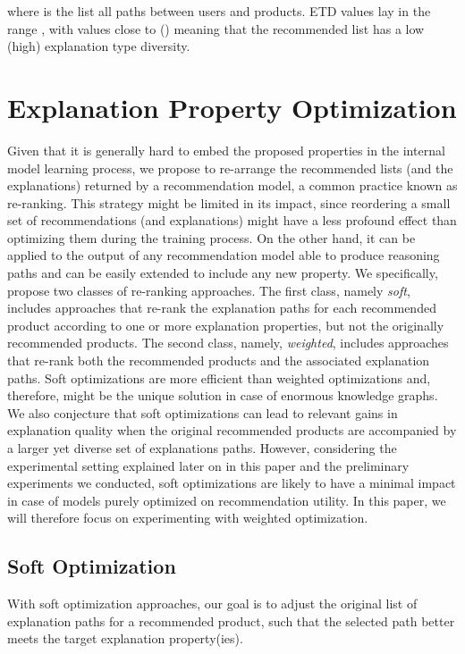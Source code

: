 \documentclass[sigconf]{acmart}
\begin{document}
\vspace{-2mm}


where  is the list all paths between users and products.
ETD values lay in the range , with values close to  () meaning that the recommended list has a low (high) explanation type diversity. 

\section{Explanation Property Optimization}\label{sec:algorithm}
Given that it is generally hard to embed the proposed properties in the internal model learning process, we propose to re-arrange the recommended lists (and the explanations) returned by a recommendation model, a common practice known as re-ranking. 
{\color{black}This strategy might be limited in its impact, since reordering a small set of recommendations (and explanations) might have a less profound effect than optimizing them during the training process.}
On the other hand, it can be applied to the output of any recommendation model {\color{black} able to produce reasoning paths} and can be easily extended to include any new property. 
We specifically, propose two classes of re-ranking approaches. 
The first class, namely {\em soft}, includes approaches that re-rank the explanation paths for each recommended product according to one or more explanation properties, but not the originally recommended products. 
The second class, namely, {\em weighted}, includes approaches that re-rank both the recommended products and the associated explanation paths.
{\color{black} Soft optimizations are more efficient than weighted optimizations and, therefore, might be the unique solution in case of enormous knowledge graphs. We also conjecture that soft optimizations can lead to relevant gains in explanation quality when the original recommended products are accompanied by a larger yet diverse set of explanations paths. However, considering the experimental setting explained later on in this paper and the preliminary experiments we conducted, soft optimizations are likely to have a minimal impact in case of models purely optimized on recommendation utility. In this paper, we will therefore focus on experimenting with weighted optimization. }

\subsection{Soft Optimization}
With soft optimization approaches, our goal is to adjust the original list of explanation paths for a recommended product, such that the selected path better meets the target explanation property(ies).
\end{document}
